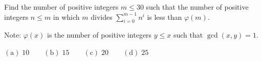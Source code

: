 Find the number of positive integers $m\leq30$ such that the number of positive integers $n\leq m$ in which $m$ divides $\sum_{i=0}^{m-1}n^i$ is less than $\varphi(m)$.



Note: $\varphi(x)$ is the number of positive integers $y\le x$ such that $\gcd(x,y)=1$.



$\mathrm{(a)}\; 10 \qquad \mathrm{(b)}\; 15 \qquad \mathrm{(c)}\; 20 \qquad \mathrm{(d)}\; 25$
